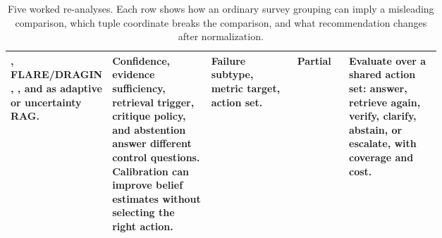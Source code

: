 \documentclass[11pt]{article}
\begin{document}
\begin{table}[t]
\begin{tabularx}{\linewidth}{>{\raggedright\arraybackslash}p{0.16\linewidth}>{\raggedright\arraybackslash}p{0.23\linewidth}>{\raggedright\arraybackslash}p{0.20\linewidth}>{\raggedright\arraybackslash}p{0.12\linewidth}X}
\citet{selfRAG2023}, FLARE/DRAGIN \citep{flare2023active,venue200DRAGIN}, \citet{sufficientContext2024}, and \citet{calibRAG2025} as adaptive or uncertainty RAG. & Confidence, evidence sufficiency, retrieval trigger, critique policy, and abstention answer different control questions. Calibration can improve belief estimates without selecting the right action. & Failure subtype, metric target, action set. & Partial & Evaluate over a shared action set: answer, retrieve again, verify, clarify, abstain, or escalate, with coverage and cost. \\
\bottomrule
\end{tabularx}
\caption{Five worked re-analyses. Each row shows how an ordinary survey grouping can imply a misleading comparison, which tuple coordinate breaks the comparison, and what recommendation changes after normalization.}
\label{tab:main-worked-examples}
\end{table}


\end{document}
